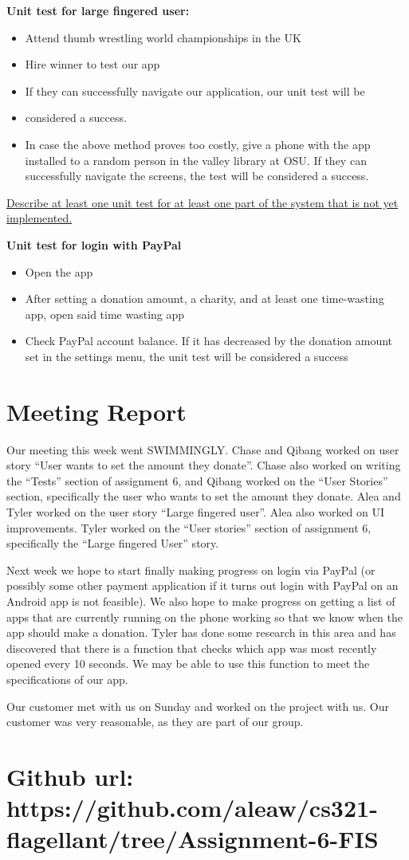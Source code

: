 \documentclass[a4paper]{article}
\begin{document}
\textbf{Unit test for large fingered user:}

\begin{itemize}
\item Attend thumb wrestling world championships in the UK
\item Hire winner to test our app
\item If they can successfully navigate our application, our unit test will be \item considered a success.
\item In case the above method proves too costly, give a phone with the app installed to a random person in the valley library at OSU. If they can successfully navigate the screens, the test will be considered a success.
\end{itemize}

\underline{Describe at least one unit test for at least one part of the system that is not yet implemented.}

\textbf{Unit test for login with PayPal}
\begin{itemize}
\item Open the app
\item After setting a donation amount, a charity, and at least one time-wasting app, open said time wasting app
\item Check PayPal account balance. If it has decreased by the donation amount set in the settings menu, the unit test will be considered a success
\end{itemize}

\section{Meeting Report}
	Our meeting this week went SWIMMINGLY. Chase and Qibang worked on user story “User wants to set the amount they donate”. Chase also worked on writing the “Tests” section of assignment 6, and Qibang worked on the “User Stories” section, specifically the user who wants to set the amount they donate. Alea and Tyler worked on the user story “Large fingered user”. Alea also worked on UI improvements. Tyler worked on the “User stories” section of assignment 6, specifically the “Large fingered User” story.
	
    Next week we hope to start finally making progress on login via PayPal (or possibly some other payment application if it turns out login with PayPal on an Android app is not feasible). We also hope to make progress on getting a list of apps that are currently running on the phone working so that we know when the app should make a donation. Tyler has done some research in this area and has discovered that there is a function that checks which app was most recently opened every 10 seconds. We may be able to use this function to meet the specifications of our app.
	
    Our customer met with us on Sunday and worked on the project with us. Our customer was very reasonable, as they are part of our group.


\section{Github url: https://github.com/aleaw/cs321-flagellant/tree/Assignment-6-FIS}
\end{document}
